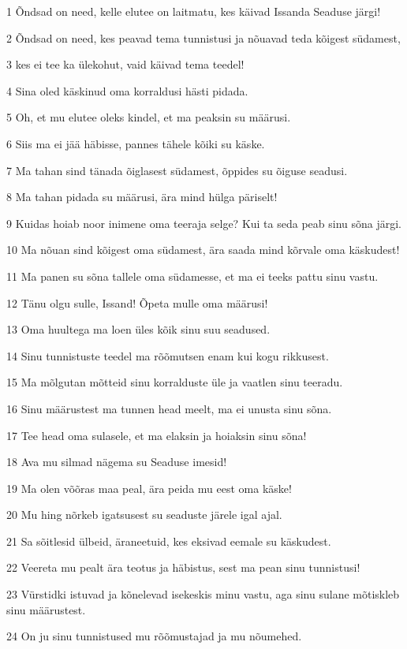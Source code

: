 \par 1 Õndsad on need, kelle elutee on laitmatu, kes käivad Issanda Seaduse järgi!
\par 2 Õndsad on need, kes peavad tema tunnistusi ja nõuavad teda kõigest südamest,
\par 3 kes ei tee ka ülekohut, vaid käivad tema teedel!
\par 4 Sina oled käskinud oma korraldusi hästi pidada.
\par 5 Oh, et mu elutee oleks kindel, et ma peaksin su määrusi.
\par 6 Siis ma ei jää häbisse, pannes tähele kõiki su käske.
\par 7 Ma tahan sind tänada õiglasest südamest, õppides su õiguse seadusi.
\par 8 Ma tahan pidada su määrusi, ära mind hülga päriselt!
\par 9 Kuidas hoiab noor inimene oma teeraja selge? Kui ta seda peab sinu sõna järgi.
\par 10 Ma nõuan sind kõigest oma südamest, ära saada mind kõrvale oma käskudest!
\par 11 Ma panen su sõna tallele oma südamesse, et ma ei teeks pattu sinu vastu.
\par 12 Tänu olgu sulle, Issand! Õpeta mulle oma määrusi!
\par 13 Oma huultega ma loen üles kõik sinu suu seadused.
\par 14 Sinu tunnistuste teedel ma rõõmutsen enam kui kogu rikkusest.
\par 15 Ma mõlgutan mõtteid sinu korralduste üle ja vaatlen sinu teeradu.
\par 16 Sinu määrustest ma tunnen head meelt, ma ei unusta sinu sõna.
\par 17 Tee head oma sulasele, et ma elaksin ja hoiaksin sinu sõna!
\par 18 Ava mu silmad nägema su Seaduse imesid!
\par 19 Ma olen võõras maa peal, ära peida mu eest oma käske!
\par 20 Mu hing nõrkeb igatsusest su seaduste järele igal ajal.
\par 21 Sa sõitlesid ülbeid, äraneetuid, kes eksivad eemale su käskudest.
\par 22 Veereta mu pealt ära teotus ja häbistus, sest ma pean sinu tunnistusi!
\par 23 Vürstidki istuvad ja kõnelevad isekeskis minu vastu, aga sinu sulane mõtiskleb sinu määrustest.
\par 24 On ju sinu tunnistused mu rõõmustajad ja mu nõumehed.
